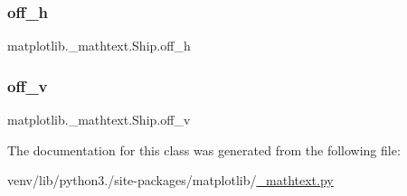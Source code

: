 \subsubsection{\texorpdfstring{off\+\_\+h}{off\_h}}
{\footnotesize\ttfamily matplotlib.\+\_\+mathtext.\+Ship.\+off\+\_\+h}

\mbox{\label{classmatplotlib_1_1__mathtext_1_1Ship_a15dd6a262df58b74f0daf2377dce6b0b}} 
\subsubsection{\texorpdfstring{off\+\_\+v}{off\_v}}
{\footnotesize\ttfamily matplotlib.\+\_\+mathtext.\+Ship.\+off\+\_\+v}



The documentation for this class was generated from the following file\+:\begin{DoxyCompactItemize}
\item 
venv/lib/python3./site-\/packages/matplotlib/\hyperlink{__mathtext_8py}{\+\_\+mathtext.\+py}\end{DoxyCompactItemize}
